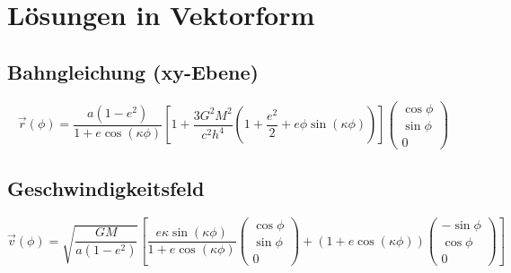 \section{Lösungen in Vektorform}

\subsection*{Bahngleichung (xy-Ebene)}
\begin{equation}
\vec{r}(\phi) = \frac{a(1-e^2)}{1+e\cos(\kappa\phi)} \left[1 + \frac{3G^2M^2}{c^2h^4}\left(1+\frac{e^2}{2}+e\phi\sin(\kappa\phi)\right)\right] \begin{pmatrix} \cos\phi \\ \sin\phi \\ 0 \end{pmatrix}
\end{equation}

\subsection*{Geschwindigkeitsfeld}
\begin{equation}
\vec{v}(\phi) = \sqrt{\frac{GM}{a(1-e^2)}} \left[
\frac{e\kappa\sin(\kappa\phi)}{1+e\cos(\kappa\phi)} \begin{pmatrix} \cos\phi \\ \sin\phi \\ 0 \end{pmatrix} + 
(1+e\cos(\kappa\phi)) \begin{pmatrix} -\sin\phi \\ \cos\phi \\ 0 \end{pmatrix}
\right]
\end{equation}